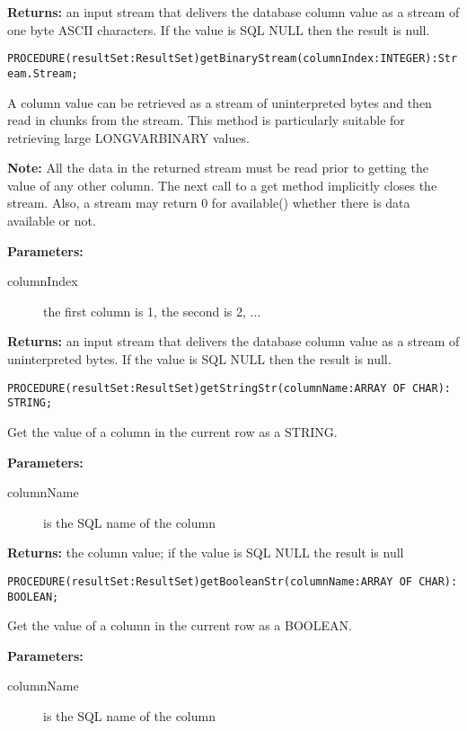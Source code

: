      {\bf Returns: } 
          an input stream that delivers the database column value as a stream of one byte ASCII characters. If the value is SQL
          NULL then the result is null. 


\verb'PROCEDURE(resultSet:ResultSet)getBinaryStream(columnIndex:INTEGER):Stream.Stream;'

     A column value can be retrieved as a stream of uninterpreted bytes and then read in chunks from the stream. This method is
     particularly suitable for retrieving large LONGVARBINARY values. 

     {\bf Note: } All the data in the returned stream must be read prior to getting the value of any other column. The next call to a get method
     implicitly closes the stream. Also, a stream may return 0 for available() whether there is data available or not. 

     {\bf Parameters: } 
\begin{description}
\item[columnIndex] the first column is 1, the second is 2, ... 
\end{description}

     {\bf Returns: } 
          an input stream that delivers the database column value as a stream of uninterpreted bytes. If the value is SQL NULL then
          the result is null. 


\verb'PROCEDURE(resultSet:ResultSet)getStringStr(columnName:ARRAY OF CHAR): STRING;'

     Get the value of a column in the current row as a STRING. 

     {\bf Parameters: } 
\begin{description}
\item[columnName] is the SQL name of the column 
\end{description}

     {\bf Returns: } 
          the column value; if the value is SQL NULL the result is null 


\verb'PROCEDURE(resultSet:ResultSet)getBooleanStr(columnName:ARRAY OF CHAR): BOOLEAN;'

     Get the value of a column in the current row as a BOOLEAN. 

     {\bf Parameters: } 
\begin{description}
\item[columnName] is the SQL name of the column 
\end{description}

